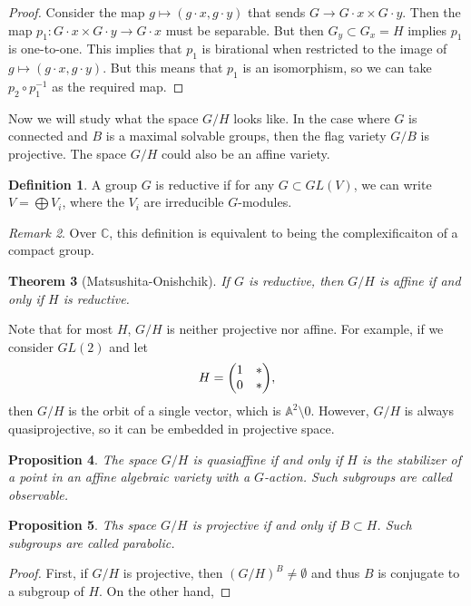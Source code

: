\documentclass[leqno, openany]{memoir}
\newtheorem{thm}{Theorem}[section]
\newtheorem{prop}[thm]{Proposition}
\theoremstyle{definition}
\newtheorem{defn}[thm]{Definition}
\theoremstyle{remark}
\newtheorem{rmk}[thm]{Remark}
\theoremstyle{plain}
\theoremstyle{definition}
\theoremstyle{remark}
\newcommand{\A}{\mathbb{A}}
\newcommand{\C}{\mathbb{C}}
\begin{document}
\begin{proof}
    Consider the map $g \mapsto (g \cdot x, g \cdot y)$ that sends $G \to G \cdot x \times G \cdot y$. Then the map $p_1 \colon G \cdot x \times G \cdot y \to G \cdot x$ must be separable. But then $G_y \subset G_x = H$ implies $p_1$ is one-to-one. This implies that $p_1$ is birational when restricted to the image of $g \mapsto (g \cdot x, g \cdot y)$. But this means that $p_1$ is an isomorphism, so we can take $p_2 \circ p_1^{-1}$ as the required map.
\end{proof}

Now we will study what the space $G/H$ looks like. In the case where $G$ is connected and $B$ is a maximal solvable groups, then the flag variety $G/B$ is projective. The space $G/H$ could also be an affine variety.

\begin{defn}
    A group $G$ is reductive if for any $G \subset GL(V)$, we can write $V = \bigoplus V_i$, where the $V_i$ are irreducible $G$-modules.
\end{defn}

\begin{rmk}
    Over $\C$, this definition is equivalent to being the complexificaiton of a compact group.
\end{rmk}

\begin{thm}[Matsushita-Onishchik]
    If $G$ is reductive, then $G/H$ is affine if and only if $H$ is reductive.
\end{thm}

Note that for most $H$, $G/H$ is neither projective nor affine. For example, if we consider $GL(2)$ and let 
\[ H = \mqty(1 & * \\ 0 & *), \]
then $G/H$ is the orbit of a single vector, which is $\A^2 \setminus 0$. However, $G/H$ is always quasiprojective, so it can be embedded in projective space.

\begin{prop}
    The space $G/H$ is quasiaffine if and only if $H$ is the stabilizer of a point in an affine algebraic variety with a $G$-action. Such subgroups are called \textit{observable}. 
\end{prop}

\begin{prop}
    Ths space $G/H$ is projective if and only if $B \subset H$. Such subgroups are called \textit{parabolic}. 
\end{prop}

\begin{proof}
    First, if $G/H$ is projective, then ${(G/H)}^B \neq \emptyset$ and thus $B$ is conjugate to a subgroup of $H$. On the other hand, 
\end{proof}
\end{document}
